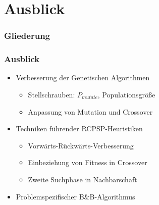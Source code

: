 \section{Ausblick}

\begin{frame}[noframenumbering]
\frametitle{Gliederung}
\end{frame}

\begin{frame}
\frametitle{Ausblick}
\begin{itemize}
\item Verbesserung der Genetischen Algorithmen
	\begin{itemize}
	\item Stellschrauben: $P_{mutate}$, Populationsgröße
	\item Anpassung von Mutation und Crossover\\[6mm]
	\end{itemize}
\item Techniken führender RCPSP-Heuristiken
	\begin{itemize}
	\item Vorwärts-Rückwärts-Verbesserung
	\item Einbeziehung von Fitness in Crossover
	\item Zweite Suchphase in Nachbarschaft\\[6mm]
	\end{itemize}
\item Problemspezifischer B\&B-Algorithmus
\end{itemize}
\end{frame}





